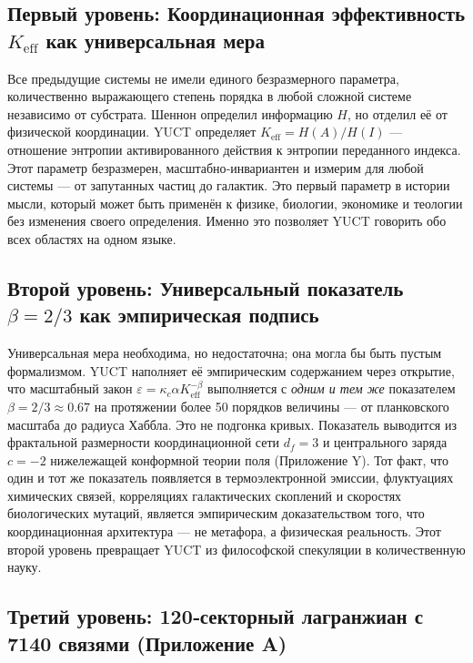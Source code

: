 \documentclass[12pt,a4paper]{article}
\begin{document}
	\subsection{Первый уровень: Координационная эффективность \(K_{\mathrm{eff}}\) как универсальная мера}
	
	Все предыдущие системы не имели единого безразмерного параметра, количественно выражающего степень порядка в любой сложной системе независимо от субстрата. Шеннон определил информацию \(H\), но отделил её от физической координации. YUCT определяет \(K_{\mathrm{eff}} = H(A)/H(I)\) — отношение энтропии активированного действия к энтропии переданного индекса. Этот параметр безразмерен, масштабно‑инвариантен и измерим для любой системы — от запутанных частиц до галактик. Это первый параметр в истории мысли, который может быть применён к физике, биологии, экономике и теологии без изменения своего определения. Именно это позволяет YUCT говорить обо всех областях на одном языке.
	
	\subsection{Второй уровень: Универсальный показатель \(\beta = 2/3\) как эмпирическая подпись}
	
	Универсальная мера необходима, но недостаточна; она могла бы быть пустым формализмом. YUCT наполняет её эмпирическим содержанием через открытие, что масштабный закон \(\varepsilon = \kappa_c \alpha K_{\mathrm{eff}}^{-\beta}\) выполняется с \emph{одним и тем же} показателем \(\beta = 2/3 \approx 0.67\) на протяжении более 50 порядков величины — от планковского масштаба до радиуса Хаббла. Это не подгонка кривых. Показатель выводится из фрактальной размерности координационной сети \(d_f = 3\) и центрального заряда \(c = -2\) нижележащей конформной теории поля (Приложение Y). Тот факт, что один и тот же показатель появляется в термоэлектронной эмиссии, флуктуациях химических связей, корреляциях галактических скоплений и скоростях биологических мутаций, является эмпирическим доказательством того, что координационная архитектура — не метафора, а физическая реальность. Этот второй уровень превращает YUCT из философской спекуляции в количественную науку.
	
	\subsection{Третий уровень: 120‑секторный лагранжиан с 7140 связями (Приложение A)}
	
\end{document}
